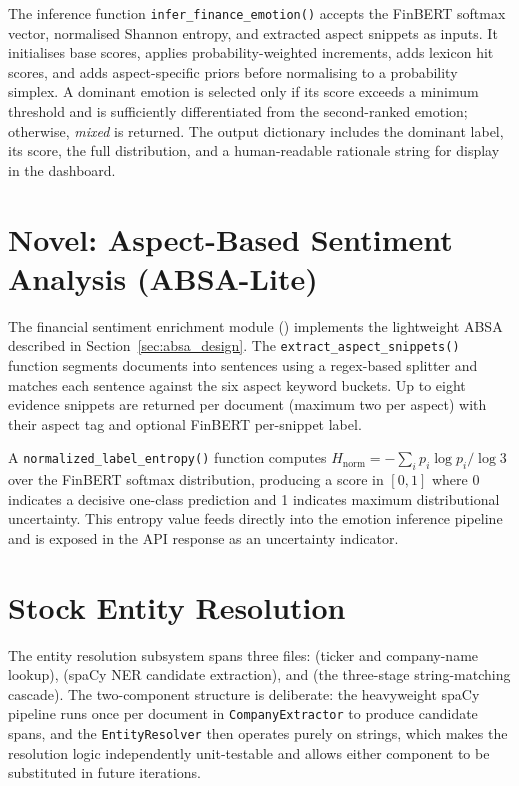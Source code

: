 The inference function \texttt{infer\_finance\_emotion()} accepts the FinBERT softmax vector, normalised Shannon entropy, and extracted aspect snippets as inputs.  It initialises base scores, applies probability-weighted increments, adds lexicon hit scores, and adds aspect-specific priors before normalising to a probability simplex.  A dominant emotion is selected only if its score exceeds a minimum threshold and is sufficiently differentiated from the second-ranked emotion; otherwise, \textit{mixed} is returned.  The output dictionary includes the dominant label, its score, the full distribution, and a human-readable rationale string for display in the dashboard.

\section{Novel: Aspect-Based Sentiment Analysis (ABSA-Lite)}
\label{sec:absa_impl}

The financial sentiment enrichment module () implements the lightweight ABSA described in Section~\ref{sec:absa_design}.  The \texttt{extract\_aspect\_snippets()} function segments documents into sentences using a regex-based splitter and matches each sentence against the six aspect keyword buckets.  Up to eight evidence snippets are returned per document (maximum two per aspect) with their aspect tag and optional FinBERT per-snippet label.

A \texttt{normalized\_label\_entropy()} function computes $H_{\text{norm}} = -\sum_i p_i \log p_i / \log 3$ over the FinBERT softmax distribution, producing a score in $[0, 1]$ where 0 indicates a decisive one-class prediction and 1 indicates maximum distributional uncertainty.  This entropy value feeds directly into the emotion inference pipeline and is exposed in the API response as an uncertainty indicator.

\section{Stock Entity Resolution}
\label{sec:entity_impl}

The entity resolution subsystem spans three files:  (ticker and company-name lookup),  (spaCy NER candidate extraction), and  (the three-stage string-matching cascade). The two-component structure is deliberate: the heavyweight spaCy pipeline runs once per document in \texttt{CompanyExtractor} to produce candidate spans, and the \texttt{EntityResolver} then operates purely on strings, which makes the resolution logic independently unit-testable and allows either component to be substituted in future iterations.

